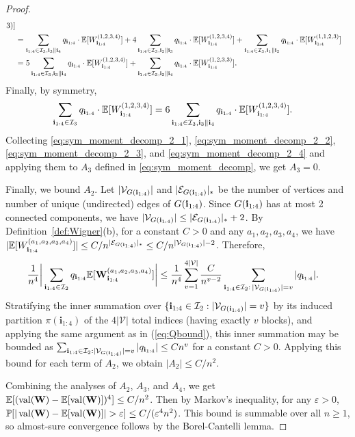 \documentclass[10pt,reqno]{amsart}
\def\cV{\mathcal{V}}
\def\cE{\mathcal{E}}
\def\val{\operatorname{val}}
\def\bW{{\mathbf{W}}}
\def\bi{\mathbf{i}}
\def\eps{\varepsilon}
\begin{document}
\begin{proof}
\begin{align}
{3)}]\notag\\
    &= \sum_{\mathbf{i}_{1:4} \in \mathcal{I}_3, \mathbf{i}_3 \parallel \mathbf{i}_4}
    q_{\mathbf{i}_{1:4}} \cdot \mathbb{E}[W_{\mathbf{i}_{1:4}}^{(1, 2, 3, 4)}]
    + 4 \sum_{\mathbf{i}_{1:4} \in \mathcal{I}_3, \mathbf{i}_2 \parallel \mathbf{i}_3} q_{\mathbf{i}_{1:4}} 
    \cdot \mathbb{E}[W_{\mathbf{i}_{1:4}}^{(1, 2, 3, 4)}]
    + \sum_{\mathbf{i}_{1:4} \in \mathcal{I}_3, \mathbf{i}_1 \parallel \mathbf{i}_2} q_{\mathbf{i}_{1:4}} 
    \cdot \mathbb{E}[W_{\mathbf{i}_{1:4}}^{(1, 1, 2, 3)}] \notag\\
    &= 5\sum_{\mathbf{i}_{1:4} \in \mathcal{I}_3, \mathbf{i}_3 \parallel \mathbf{i}_4} q_{\mathbf{i}_{1:4}} 
    \cdot \mathbb{E}[W_{\mathbf{i}_{1:4}}^{(1, 2, 3, 4)}]
    + \sum_{\mathbf{i}_{1:4} \in \mathcal{I}_3, \mathbf{i}_3 \parallel \mathbf{i}_4} q_{\mathbf{i}_{1:4}} 
    \cdot \mathbb{E}[W_{\mathbf{i}_{1:4}}^{(1, 2, 3, 3)}].
\end{align}
Finally, by symmetry,
\begin{align}\label{eq:sym_moment_decomp_2_4}
    \sum_{\mathbf{i}_{1:4} \in \mathcal{I}_3} q_{\mathbf{i}_{1:4}} \cdot \mathbb{E}[W_{\mathbf{i}_{1:4}}^{(1, 2, 3,
4)}]&=6\sum_{\mathbf{i}_{1:4} \in \mathcal{I}_3, \mathbf{i}_3 \parallel \mathbf{i}_4}
    q_{\mathbf{i}_{1:4}} \cdot \mathbb{E}[W_{\mathbf{i}_{1:4}}^{(1, 2, 3, 4)}].
\end{align}
Collecting \eqref{eq:sym_moment_decomp_2_1}, \eqref{eq:sym_moment_decomp_2_2},
\eqref{eq:sym_moment_decomp_2_3}, and \eqref{eq:sym_moment_decomp_2_4}
and applying them to $A_3$ defined in \eqref{eq:sym_moment_decomp}, we get
$A_3=0$.
 
Finally, we bound $A_2$. Let $|\cV_{G(\ib_{1:4})}|$ and
$|\cE_{G(\ib_{1:4})}|_*$ be the number of vertices and number of
unique (undirected) edges of
$G(\mathbf{i}_{1:4})$. Since $G(\mathbf{i}_{1:4})$ has at most 2 connected
components, we have $|\cV_{G(\ib_{1:4})}| \leq |\cE_{G(\ib_{1:4})}|_*+2$.
By Definition~\ref{def:Wigner}(b), for a constant $C>0$ and any
$a_1,a_2,a_3,a_4$, we have 
$|\EE[W_{\ib_{1:4}}^{(a_1, a_2, a_3, a_4)}]| \leq
C/n^{|\cE_{G(\ib_{1:4})}|_*} \leq C/n^{|\cV_{G(\ib_{1:4})}|-2}$. Therefore, 
\begin{align*}
    \frac{1}{n^4} \bigg|\sum_{\ib_{1:4} \in \cI_2} q_{\ib_{1:4}} 
    \EE[\bW_{\ib_{1:4}}^{(a_1, a_2, a_3, a_4)}]\bigg| &\leq \frac{1}{n^4} 
\sum_{v=1}^{4|\cV|} \frac{C}{n^{v-2}} 
    \sum_{\ib_{1:4} \in \cI_2:\,|\cV_{G(\ib_{1:4})}|=v} |q_{\ib_{1:4}}|.
\end{align*}
Stratifying the inner summation over $\{\bi_{1:4} \in
\cI_2:|\cV_{G(\bi_{1:4})}|=v\}$ by its induced partition
$\pi(\bi_{1:4})$ of the $4|\cV|$ total indices (having exactly $v$
blocks), and applying the same argument as in
(\ref{eq:Qbound}), this inner summation may be bounded
as $\sum_{\ib_{1:4} \in \cI_2:|\cV_{G(\ib_{1:4})}|=v} |q_{\ib_{1:4}}| \leq
Cn^v$ for a constant $C>0$. Applying this bound for each term of $A_2$,
we obtain $|A_2| \leq C/n^2$.

Combining the analyses of $A_2$, $A_3$, and $A_4$, we get 
$\EE[(\val(\bW) - \EE[\val(\bW)])^4] \leq C/n^2$.
Then by Markov's inequality, for any $\eps > 0$,
$\PP[|\val(\bW) - \EE[\val(\bW)]| > \eps] \leq C/(\eps^4 n^2)$. This
bound is summable over all $n \geq 1$, so almost-sure convergence follows by
the Borel-Cantelli lemma.
\end{proof}
\end{document}
